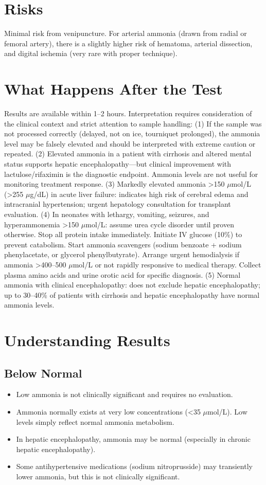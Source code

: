\section*{Risks}
Minimal risk from venipuncture. For arterial ammonia (drawn from radial or femoral artery), there is a slightly higher risk of hematoma, arterial dissection, and digital ischemia (very rare with proper technique).

\section*{What Happens After the Test}
Results are available within 1--2 hours. Interpretation requires consideration of the clinical context and strict attention to sample handling: (1) If the sample was not processed correctly (delayed, not on ice, tourniquet prolonged), the ammonia level may be falsely elevated and should be interpreted with extreme caution or repeated. (2) Elevated ammonia in a patient with cirrhosis and altered mental status supports hepatic encephalopathy---but clinical improvement with lactulose/rifaximin is the diagnostic endpoint. Ammonia levels are not useful for monitoring treatment response. (3) Markedly elevated ammonia >150 $\mu$mol/L (>255 $\mu$g/dL) in acute liver failure: indicates high risk of cerebral edema and intracranial hypertension; urgent hepatology consultation for transplant evaluation. (4) In neonates with lethargy, vomiting, seizures, and hyperammonemia >150 $\mu$mol/L: assume urea cycle disorder until proven otherwise. Stop all protein intake immediately. Initiate IV glucose (10\%) to prevent catabolism. Start ammonia scavengers (sodium benzoate + sodium phenylacetate, or glycerol phenylbutyrate). Arrange urgent hemodialysis if ammonia >400--500 $\mu$mol/L or not rapidly responsive to medical therapy. Collect plasma amino acids and urine orotic acid for specific diagnosis. (5) Normal ammonia with clinical encephalopathy: does not exclude hepatic encephalopathy; up to 30--40\% of patients with cirrhosis and hepatic encephalopathy have normal ammonia levels.

\section*{Understanding Results}

\subsection*{Below Normal}
\begin{itemize}
  \item Low ammonia is not clinically significant and requires no evaluation.
  \item Ammonia normally exists at very low concentrations (<35 $\mu$mol/L). Low levels simply reflect normal ammonia metabolism.
  \item In hepatic encephalopathy, ammonia may be normal (especially in chronic hepatic encephalopathy).
  \item Some antihypertensive medications (sodium nitroprusside) may transiently lower ammonia, but this is not clinically significant.
\end{itemize}

